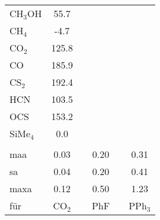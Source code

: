\begin{table}[ht!]
\begin{tabular}{lc|lc|lc}
    CH$_{3}$OH & 55.7  &       &       &       &  \\
    CH$_{4}$   & -4.7  &       &       &       &  \\
    CO$_{2}$   & 125.8 &       &       &       &  \\
    CO    & 185.9 &       &       &       &  \\
    CS$_{2}$   & 192.4 &       &       &       &  \\
    HCN   & 103.5 &       &       &       &  \\
    OCS   & 153.2 &       &       &       &  \\
    SiMe$_{4}$ & 0.0   &       &       &       &  \\
          &       &       &       &       &  \\
    \ac{maa}   & 0.03   &    & 0.20   &       & 0.31 \\
    \ac{sa}   & 0.04   &    & 0.20   &       & 0.41 \\
    \ac{maxa} & 0.12 & & 0.50 & & 1.23\\
    für & CO$_2$ & & PhF & & PPh$_3$ 
    \end{tabular}%
  \label{tab:rierror}%
\end{table}%

